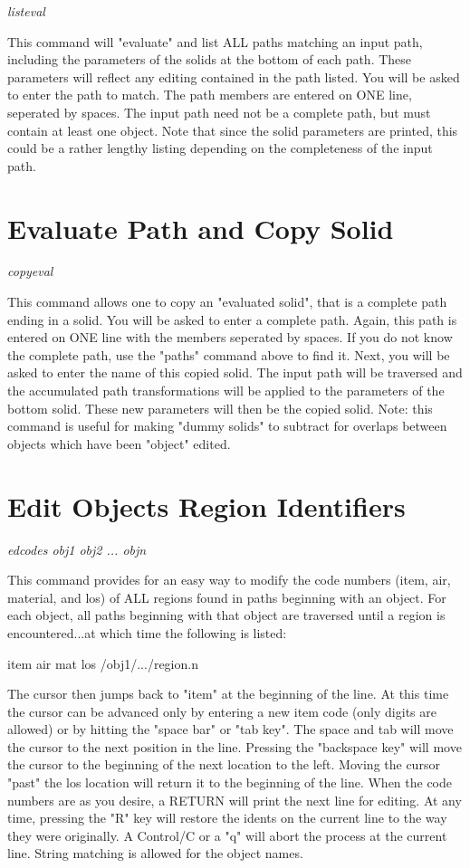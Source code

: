 {\em \center
listeval
}

This command will "evaluate" and list ALL paths matching an input path, including the
parameters of the solids at the bottom of each path.
These parameters will reflect any editing contained in the path listed.
You will be asked to enter the path to match.
The path members are entered on ONE line, seperated by spaces.
The input path need not be a complete path, but must contain at least
one object.
Note that since the solid parameters are printed, this could be a
rather lengthy listing depending on the completeness of the input path.

\section{Evaluate Path and Copy Solid}

{\em \center
copyeval
}

This command allows one to copy an "evaluated solid", that is a complete path
ending in a solid.
You will be asked to enter a complete path.
Again, this path is entered on ONE line with the members seperated by spaces.
If you do not know the complete path, use the "paths" command above to find it.
Next, you will be asked to enter the name of this copied solid.
The input path will be traversed and the accumulated path transformations will
be applied to the parameters of the bottom solid.
These new parameters will then be the copied solid.
Note:  this command is useful for making "dummy solids" to subtract for
overlaps between objects which have been "object" edited.

\section{Edit Objects Region Identifiers}

{\em \center
edcodes obj1 obj2 ... objn
}

This command provides for an easy way to modify the code numbers (item, air, material, and los)
of ALL regions found in paths beginning with an object.
For each object, all paths beginning with that object are traversed until a region
is encountered...at which time the following is listed:

item  air  mat  los      /obj1/.../region.n

The cursor then jumps back to "item" at the beginning of the line.
At this time the cursor can be advanced only by entering a new item code
(only digits are allowed) or by hitting the "space bar" or "tab key".
The space and tab will move the cursor to the next position in the line.
Pressing the "backspace key" will move the cursor to the beginning of
the next location to the left.
Moving the cursor "past" the los location
will return it to the beginning of the line.
When the code numbers are as you desire,
a RETURN will print the next line
for editing.
At any time, pressing the "R" key will restore the idents on the current
line to the way they were originally.
A Control/C or a "q" will abort the process at the current line.
String matching is allowed for the object names.

